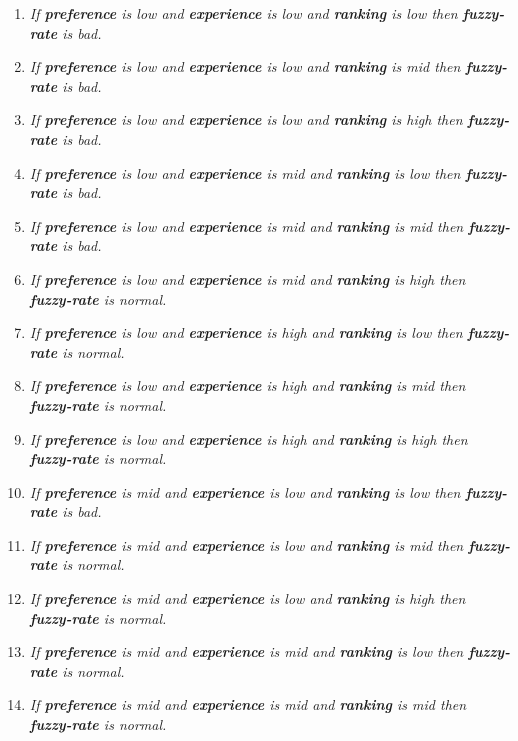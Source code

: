 \begin{enumerate} 

\item \textit{If \textbf{preference} is low and 
\textbf{experience} is low and \textbf{ranking} is low then \textbf{fuzzy-rate} is bad.}
\item \textit{If \textbf{preference} is low and 
\textbf{experience} is low and \textbf{ranking} is mid then \textbf{fuzzy-rate} is bad.}
\item \textit{If \textbf{preference} is low and 
\textbf{experience} is low and \textbf{ranking} is high then \textbf{fuzzy-rate} is bad.}
\item \textit{If \textbf{preference} is low and 
\textbf{experience} is mid and \textbf{ranking} is low then \textbf{fuzzy-rate} is bad.}
\item \textit{If \textbf{preference} is low and 
\textbf{experience} is mid and \textbf{ranking} is mid then \textbf{fuzzy-rate} is bad.}
\item \textit{If \textbf{preference} is low and 
\textbf{experience} is mid and \textbf{ranking} is high then \textbf{fuzzy-rate} is normal.}
\item \textit{If \textbf{preference} is low and 
\textbf{experience} is high and \textbf{ranking} is low then \textbf{fuzzy-rate} is normal.}
\item \textit{If \textbf{preference} is low and 
\textbf{experience} is high and \textbf{ranking} is mid then \textbf{fuzzy-rate} is normal.}
\item \textit{If \textbf{preference} is low and 
\textbf{experience} is high and \textbf{ranking} is high then \textbf{fuzzy-rate} is normal.}
\item \textit{If \textbf{preference} is mid and 
\textbf{experience} is low and \textbf{ranking} is low then \textbf{fuzzy-rate} is bad.}
\item \textit{If \textbf{preference} is mid and 
\textbf{experience} is low and \textbf{ranking} is mid then \textbf{fuzzy-rate} is normal.}
\item \textit{If \textbf{preference} is mid and 
\textbf{experience} is low and \textbf{ranking} is high then \textbf{fuzzy-rate} is normal.}
\item \textit{If \textbf{preference} is mid and 
\textbf{experience} is mid and \textbf{ranking} is low then \textbf{fuzzy-rate} is normal.}
\item \textit{If \textbf{preference} is mid and 
\textbf{experience} is mid and \textbf{ranking} is mid then \textbf{fuzzy-rate} is normal.}

\end{enumerate}
